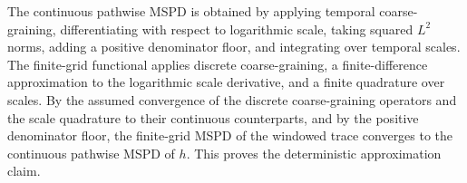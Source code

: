 The continuous pathwise MSPD is obtained by applying temporal coarse-graining, differentiating with respect to logarithmic scale, taking squared \(L^2\) norms, adding a positive denominator floor, and integrating over temporal scales.  The finite-grid functional applies discrete coarse-graining, a finite-difference approximation to the logarithmic scale derivative, and a finite quadrature over scales.  By the assumed convergence of the discrete coarse-graining operators and the scale quadrature to their continuous counterparts, and by the positive denominator floor, the finite-grid MSPD of the windowed trace converges to the continuous pathwise MSPD of \(h\).  This proves the deterministic approximation claim.
